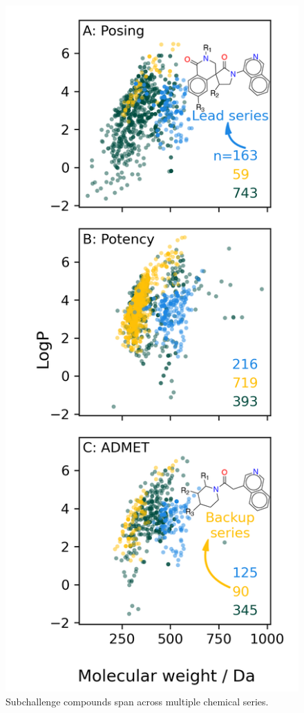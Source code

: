 \documentclass[journal=jacsat,manuscript=article]{achemso}
\begin{document}
\begin{figure}
    \includegraphics[scale=0.9]{03_figs_data_preparation/subchallenge_physprops_with_scaffolds.png}
  \caption{Subchallenge compounds span across multiple chemical series. }
  \label{fgr:physprops_scaffolds}
\end{figure}
\end{document}
